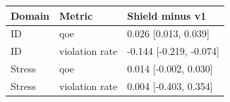 \begin{tabular}{lll}
\toprule
Domain & Metric & Shield minus v1 \\
\midrule
ID & qoe & 0.026 [0.013, 0.039] \\
ID & violation rate & -0.144 [-0.219, -0.074] \\
Stress & qoe & 0.014 [-0.002, 0.030] \\
Stress & violation rate & 0.004 [-0.403, 0.354] \\
\bottomrule
\end{tabular}
